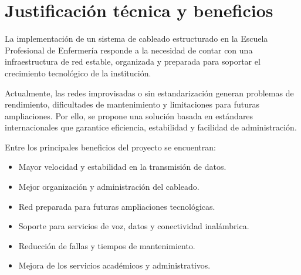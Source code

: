 \section{Justificación técnica y beneficios}
La implementación de un sistema de cableado estructurado en la Escuela Profesional
de Enfermería responde a la necesidad de contar con una infraestructura de red
estable, organizada y preparada para soportar el crecimiento tecnológico de la
institución.

Actualmente, las redes improvisadas o sin estandarización generan problemas de
rendimiento, dificultades de mantenimiento y limitaciones para futuras ampliaciones.
Por ello, se propone una solución basada en estándares internacionales que garantice
eficiencia, estabilidad y facilidad de administración.

Entre los principales beneficios del proyecto se encuentran:

\begin{itemize}
    \item Mayor velocidad y estabilidad en la transmisión de datos.
    
    \item Mejor organización y administración del cableado.
    
    \item Red preparada para futuras ampliaciones tecnológicas.
    
    \item Soporte para servicios de voz, datos y conectividad inalámbrica.
    
    \item Reducción de fallas y tiempos de mantenimiento.
    
    \item Mejora de los servicios académicos y administrativos.
\end{itemize}